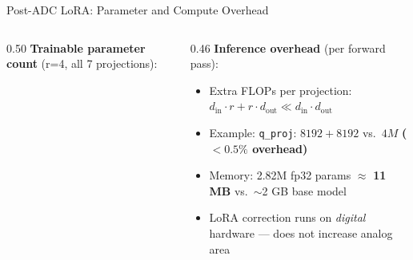 \begin{frame}[shrink=20]{Post-ADC LoRA: Parameter and Compute Overhead}
  \begin{columns}[T]
    \begin{column}{0.50\textwidth}
      \textbf{Trainable parameter count} (r=4, all 7 projections):
      \begin{center}
      \renewcommand{\arraystretch}{1.2}
      \end{center}
    \end{column}
    \begin{column}{0.46\textwidth}
      \textbf{Inference overhead} (per forward pass):
      \begin{itemize}
        \item Extra FLOPs per projection:
              $d_\mathrm{in}{\cdot}r + r{\cdot}d_\mathrm{out} \ll d_\mathrm{in}{\cdot}d_\mathrm{out}$
        \item Example: \texttt{q\_proj}: $8192{+}8192$ vs.\ $4M$
              \textbf{($<\!0.5\%$ overhead)}
        \item Memory: 2.82M fp32 params $\approx$ \textbf{11 MB}
              vs.\ $\sim$2 GB base model
        \item LoRA correction runs on \emph{digital} hardware
              — does not increase analog area
      \end{itemize}


\end{column}
\end{columns}
\end{frame}
